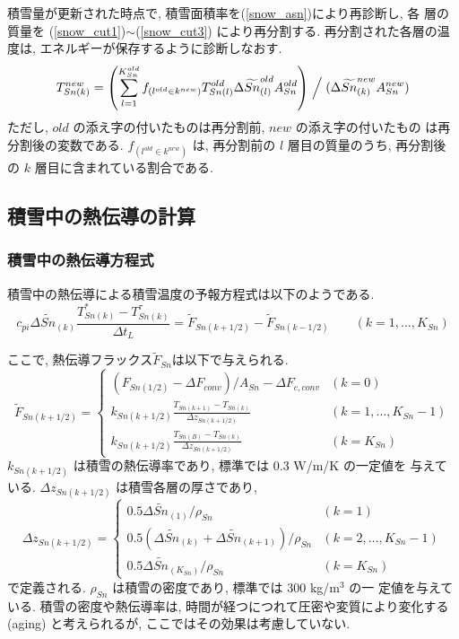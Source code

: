 積雪量が更新された時点で, 積雪面積率を(\ref{snow_asn})により再診断し, 各
層の質量を (\ref{snow_cut1})$\sim$(\ref{snow_cut3}) により再分割する.  
再分割された各層の温度は, エネルギーが保存するように診断しなおす. 
\begin{equation}
 T_{Sn(k)}^{new} = \left(\sum_{l=1}^{K_{Sn}^{old}} f_{(l^{old}\in k^{new})} T_{Sn(l)}^{old} \Delta \widetilde{Sn}_{(l)}^{old} A_{Sn}^{old} \right)
\Bigm/ (\Delta \widetilde{Sn}_{(k)}^{new} A_{Sn}^{new})
\end{equation}
ただし, $old$ の添え字の付いたものは再分割前, $new$ の添え字の付いたもの
は再分割後の変数である. 
$f_{(l^{old}\in k^{new})}$ は, 再分割前の $l$ 層目の質量のうち, 再分割後
の $k$ 層目に含まれている割合である. 

\subsection{積雪中の熱伝導の計算}

\subsubsection{積雪中の熱伝導方程式}

積雪中の熱伝導による積雪温度の予報方程式は以下のようである. 
\begin{equation}
c_{pi}\Delta \widetilde{Sn}_{(k)} \frac{T_{Sn(k)}^* - T_{Sn(k)}^{\tau}}{\Delta t_L} = \widetilde{F}_{Sn(k+1/2)} - \widetilde{F}_{Sn(k-1/2)}
\qquad (k=1,\ldots,K_{Sn})
\label{snow_diff}
\end{equation}

ここで, 熱伝導フラックス$\widetilde{F}_{Sn}$は以下で与えられる. 
\begin{equation}
 \widetilde{F}_{Sn(k+1/2)} =
\left\{
\begin{array}{ll}
( F_{Sn(1/2)} - \Delta F_{conv})/A_{Sn} - \Delta F_{c,conv} 
& (k=0)\\
\displaystyle{
k_{Sn(k+1/2)} \frac{T_{Sn(k+1)} - T_{Sn(k)}}{\Delta z_{Sn(k+1/2)}}
}
& (k=1,\ldots,K_{Sn}-1) \\
\displaystyle{
k_{Sn(k+1/2)} \frac{T_{Sn(B)} - T_{Sn(k)}}{\Delta z_{Sn(k+1/2)}}
}
& (k=K_{Sn})
\end{array}
\right. \label{snow_dflux}
\end{equation}
$k_{Sn(k+1/2)}$ は積雪の熱伝導率であり, 標準では 0.3 W/m/K の一定値を
与えている. $\Delta z_{Sn(k+1/2)}$ は積雪各層の厚さであり, 
\begin{equation}
 \Delta z_{Sn(k+1/2)} =
\left\{
\begin{array}{ll}
 0.5 \Delta \widetilde{Sn}_{(1)} / \rho_{Sn} & (k=1)\\
 0.5 (\Delta \widetilde{Sn}_{(k)}+\Delta \widetilde{Sn}_{(k+1)}) / \rho_{Sn} 
& (k=2,\ldots,K_{Sn}-1)\\
 0.5 \Delta \widetilde{Sn}_{(K_{Sn})} / \rho_{Sn} & (k=K_{Sn})
\end{array}
\right.
\end{equation}
で定義される. $\rho_{Sn}$ は積雪の密度であり, 標準では 300 kg/m$^3$ の一
定値を与えている. 
積雪の密度や熱伝導率は, 時間が経つにつれて圧密や変質により変化する
(aging) と考えられるが, ここではその効果は考慮していない. 

